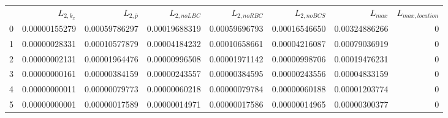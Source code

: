 \begin{tabular}{lrrrrrrr}
 & $L_{2,k_x}$ & $L_{2,\bar{p}}$ & $L_{2,noLBC}$ & $L_{2,noRBC}$ & $L_{2,noBCS}$ & $L_{max}$ & $L_{max,location}$ \\
0 & 0.00000155279 & 0.00059786297 & 0.00019688319 & 0.00059696793 & 0.00016546650 & 0.00324886266 & 0 \\
1 & 0.00000028331 & 0.00010577879 & 0.00004184232 & 0.00010658661 & 0.00004216087 & 0.00079036919 & 0 \\
2 & 0.00000002131 & 0.00001964476 & 0.00000996508 & 0.00001971142 & 0.00000998706 & 0.00019476231 & 0 \\
3 & 0.00000000161 & 0.00000384159 & 0.00000243557 & 0.00000384595 & 0.00000243556 & 0.00004833159 & 0 \\
4 & 0.00000000011 & 0.00000079773 & 0.00000060218 & 0.00000079784 & 0.00000060188 & 0.00001203774 & 0 \\
5 & 0.00000000001 & 0.00000017589 & 0.00000014971 & 0.00000017586 & 0.00000014965 & 0.00000300377 & 0 \\
\end{tabular}
